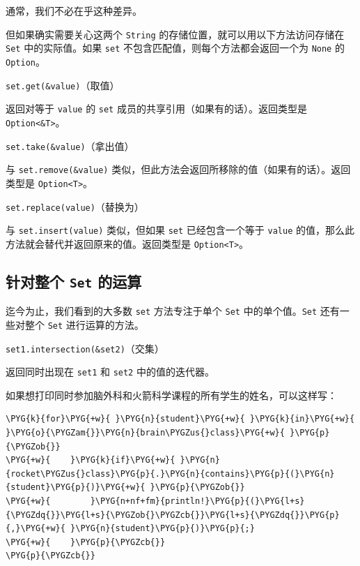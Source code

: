 通常，我们不必在乎这种差异。

但如果确实需要关心这两个 \texttt{String} 的存储位置，就可以用以下方法访问存储在 \texttt{Set} 中的实际值。如果 \texttt{set} 不包含匹配值，则每个方法都会返回一个为 \texttt{None} 的 \texttt{Option}。

\begin{mySidenote}
\texttt{set.get(\&value)}（取值）
\end{mySidenote}

返回对等于 \texttt{value} 的 \texttt{set} 成员的共享引用（如果有的话）。返回类型是 \texttt{Option<\&T>}。

\begin{mySidenote}
\texttt{set.take(\&value)}（拿出值）
\end{mySidenote}

与 \texttt{set.remove(\&value)} 类似，但此方法会返回所移除的值（如果有的话）。返回类型是 \texttt{Option<T>}。

\begin{mySidenote}
\texttt{set.replace(value)}（替换为）
\end{mySidenote}

与 \texttt{set.insert(value)} 类似，但如果 \texttt{set} 已经包含一个等于 \texttt{value} 的值，那么此方法就会替代并返回原来的值。返回类型是 \texttt{Option<T>}。

\subsection{针对整个 \texttt{Set} 的运算}

迄今为止，我们看到的大多数 \texttt{set} 方法专注于单个 \texttt{Set} 中的单个值。\texttt{Set} 还有一些对整个 \texttt{Set} 进行运算的方法。

\begin{myNote}
\texttt{set1.intersection(\&set2)}（交集）
\end{myNote}

返回同时出现在 \texttt{set1} 和 \texttt{set2} 中的值的迭代器。

如果想打印同时参加脑外科和火箭科学课程的所有学生的姓名，可以这样写：

\begin{Verbatim}[commandchars=\\\{\},breaklines=true,breakanywhere=true,fontsize=\codefont,xleftmargin=17bp]
\PYG{k}{for}\PYG{+w}{ }\PYG{n}{student}\PYG{+w}{ }\PYG{k}{in}\PYG{+w}{ }\PYG{o}{\PYGZam{}}\PYG{n}{brain\PYGZus{}class}\PYG{+w}{ }\PYG{p}{\PYGZob{}}
\PYG{+w}{    }\PYG{k}{if}\PYG{+w}{ }\PYG{n}{rocket\PYGZus{}class}\PYG{p}{.}\PYG{n}{contains}\PYG{p}{(}\PYG{n}{student}\PYG{p}{)}\PYG{+w}{ }\PYG{p}{\PYGZob{}}
\PYG{+w}{        }\PYG{n+nf+fm}{println!}\PYG{p}{(}\PYG{l+s}{\PYGZdq{}}\PYG{l+s}{\PYGZob{}\PYGZcb{}}\PYG{l+s}{\PYGZdq{}}\PYG{p}{,}\PYG{+w}{ }\PYG{n}{student}\PYG{p}{)}\PYG{p}{;}
\PYG{+w}{    }\PYG{p}{\PYGZcb{}}
\PYG{p}{\PYGZcb{}}
\end{Verbatim}

